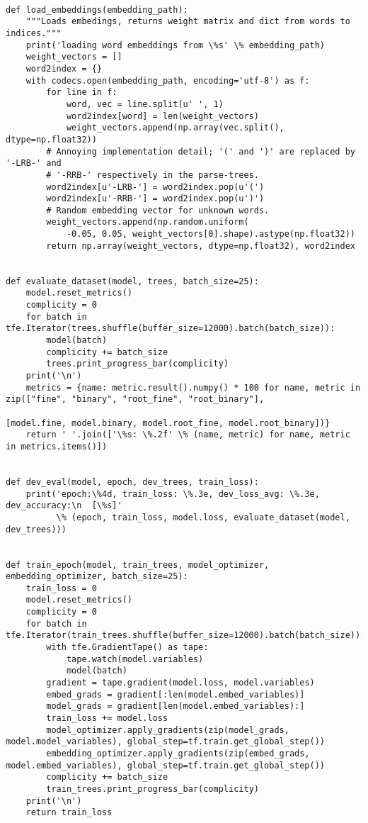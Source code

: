 \begin{lstlisting}[style=app]

def load_embeddings(embedding_path):
    """Loads embedings, returns weight matrix and dict from words to indices."""
    print('loading word embeddings from \%s' \% embedding_path)
    weight_vectors = []
    word2index = {}
    with codecs.open(embedding_path, encoding='utf-8') as f:
        for line in f:
            word, vec = line.split(u' ', 1)
            word2index[word] = len(weight_vectors)
            weight_vectors.append(np.array(vec.split(), dtype=np.float32))
        # Annoying implementation detail; '(' and ')' are replaced by '-LRB-' and
        # '-RRB-' respectively in the parse-trees.
        word2index[u'-LRB-'] = word2index.pop(u'(')
        word2index[u'-RRB-'] = word2index.pop(u')')
        # Random embedding vector for unknown words.
        weight_vectors.append(np.random.uniform(
            -0.05, 0.05, weight_vectors[0].shape).astype(np.float32))
        return np.array(weight_vectors, dtype=np.float32), word2index


def evaluate_dataset(model, trees, batch_size=25):
    model.reset_metrics()
    complicity = 0
    for batch in tfe.Iterator(trees.shuffle(buffer_size=12000).batch(batch_size)):
        model(batch)
        complicity += batch_size
        trees.print_progress_bar(complicity)
    print('\n')
    metrics = {name: metric.result().numpy() * 100 for name, metric in zip(["fine", "binary", "root_fine", "root_binary"],
                                                                           [model.fine, model.binary, model.root_fine, model.root_binary])}
    return ' '.join(['\%s: \%.2f' \% (name, metric) for name, metric in metrics.items()])


def dev_eval(model, epoch, dev_trees, train_loss):
    print('epoch:\%4d, train_loss: \%.3e, dev_loss_avg: \%.3e, dev_accuracy:\n  [\%s]'
          \% (epoch, train_loss, model.loss, evaluate_dataset(model, dev_trees)))


def train_epoch(model, train_trees, model_optimizer, embedding_optimizer, batch_size=25):
    train_loss = 0
    model.reset_metrics()
    complicity = 0
    for batch in tfe.Iterator(train_trees.shuffle(buffer_size=12000).batch(batch_size)):
        with tfe.GradientTape() as tape:
            tape.watch(model.variables)
            model(batch)
        gradient = tape.gradient(model.loss, model.variables)
        embed_grads = gradient[:len(model.embed_variables)]
        model_grads = gradient[len(model.embed_variables):]
        train_loss += model.loss
        model_optimizer.apply_gradients(zip(model_grads, model.model_variables), global_step=tf.train.get_global_step())
        embedding_optimizer.apply_gradients(zip(embed_grads, model.embed_variables), global_step=tf.train.get_global_step())
        complicity += batch_size
        train_trees.print_progress_bar(complicity)
    print('\n')
    return train_loss



\end{lstlisting}
